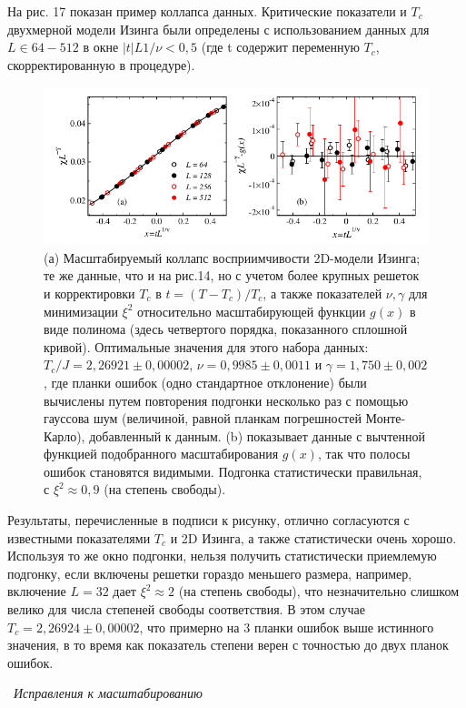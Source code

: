 \documentclass[11pt]{article}
\begin{document}
На рис. 17 показан пример коллапса данных. Критические показатели и $T_c$ двухмерной модели Изинга были определены с использованием данных для $L \in {64 - 512}$ в окне $|t| L 1 / \nu <0,5$ (где t содержит переменную $T_c$, скорректированную в процедуре). 

\begin{figure}[htp]
\centering
\includegraphics[scale=0.5]{fig17}
\caption{(а) Масштабируемый коллапс восприимчивости 2D-модели Изинга; те же данные, что и на рис.14, но с учетом более крупных решеток и корректировки $T_c$ в $t = (T - T_c) / T_c$, а также показателей $\nu, \gamma$ для минимизации $\xi^2$ относительно масштабирующей функции $g(x)$ в виде полинома (здесь четвертого порядка, показанного сплошной кривой). Оптимальные значения для этого набора данных: $T_c/ J = 2,26921 \pm 0,00002$, $\nu = 0,9985 \pm 0,0011$ и $\gamma = 1,750 \pm 0,002$, где планки ошибок (одно стандартное отклонение) были вычислены путем повторения подгонки несколько раз с помощью гауссова шум (величиной, равной планкам погрешностей Монте-Карло), добавленный к данным. (b) показывает данные с вычтенной функцией подобранного масштабирования $g(x)$, так что полосы ошибок становятся видимыми. Подгонка статистически правильная, с $\xi^2 \approx 0,9$ (на степень свободы).}
\label{}
\end{figure}

Результаты, перечисленные в подписи к рисунку, отлично согласуются с известными показателями $T_c$ и 2D Изинга, а также статистически очень хорошо. Используя то же окно подгонки, нельзя получить статистически приемлемую подгонку, если включены решетки гораздо меньшего размера, например, включение $L = 32$ дает $\xi^2 \approx 2$ (на степень свободы), что незначительно слишком велико для числа степеней свободы соответствия. В этом случае $T_c = 2,26924 \pm 0,00002$, что примерно на 3 планки ошибок выше истинного значения, в то время как показатель степени верен с точностью до двух планок ошибок.

~\emph{Исправления к масштабированию}
\end{document}
